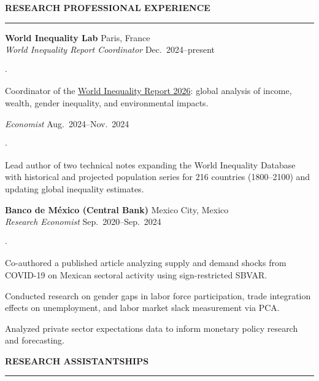 \documentclass[11pt,letterpaper]{article}
\renewcommand{\section}[1]{%
  \vspace{0.8em}%
  {\large\bfseries\MakeUppercase{#1}}%
  \vspace{0.3em}%
  \hrule%
  \vspace{0.4em}%
}
\newenvironment{citemize}{%
  \begin{list}{$\cdot$}{%
    \setlength{\leftmargin}{1.5em}%
    \setlength{\itemsep}{0pt}%
    \setlength{\parsep}{0pt}%
    \setlength{\topsep}{0.2em}%
    \setlength{\partopsep}{0pt}%
  }%
}{%
  \end{list}%
}
\begin{document}

\section{Research Professional Experience}

\textbf{World Inequality Lab} \hfill Paris, France \\
\textit{World Inequality Report Coordinator} \hfill Dec.\ 2024--present

\begin{citemize}
  \item Coordinator of the \href{https://wir2026.wid.world/}{World Inequality Report 2026}: global analysis of income, wealth, gender inequality, and environmental impacts.
\end{citemize}

\textit{Economist} \hfill Aug.\ 2024--Nov.\ 2024

\begin{citemize}
  \item Lead author of two technical notes expanding the World Inequality Database with historical and projected population series for 216 countries (1800--2100) and updating global inequality estimates.
\end{citemize}

\textbf{Banco de M\'{e}xico (Central Bank)} \hfill Mexico City, Mexico \\
\textit{Research Economist} \hfill Sep.\ 2020--Sep.\ 2024

\begin{citemize}
  \item Co-authored a published article analyzing supply and demand shocks from COVID-19 on Mexican sectoral activity using sign-restricted SBVAR.
  \item Conducted research on gender gaps in labor force participation, trade integration effects on unemployment, and labor market slack measurement via PCA.
  \item Analyzed private sector expectations data to inform monetary policy research and forecasting.
\end{citemize}


\section{Research Assistantships}
\end{document}
